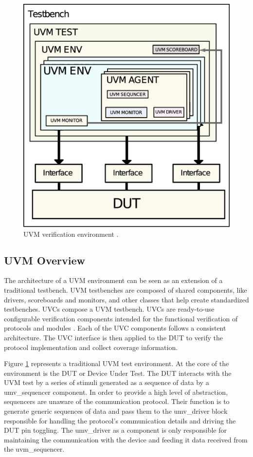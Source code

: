 \begin{figure}[htb]
\centering
\includegraphics[width=0.5\linewidth]{pictures/UVM_testbench_architecture.eps}
\caption{UVM verification environment \cite{methodology20111}.}
\label{fig:UVMvenv}
\end{figure}

\subsection{UVM Overview}
The architecture of a UVM environment can be seen as an extension of a
traditional testbench. UVM testbenches are composed of shared components, like
drivers, scoreboards and monitors, and other classes that help create
standardized testbenches. UVCs compose a UVM testbench. UVCs are ready-to-use
configurable verification components intended for the functional verification of
protocols and modules \cite{methodology20111}. Each of the UVC components
follows a consistent architecture. The UVC interface is then applied to the DUT
to verify the protocol implementation and collect coverage information.

Figure \ref{fig:UVMvenv} represents a traditional UVM test environment. At the
core of the environment is the DUT or Device Under Test. The DUT interacts with
the UVM test by a series of stimuli generated as a sequence of data by a
umv\_sequencer component. In order to provide a high level of abstraction,
sequencers are unaware of the communication protocol. Their function is to
generate generic sequences of data and pass them to the umv\_driver block
responsible for handling the protocol's communication details and driving the
DUT pin toggling. The umv\_driver as a component is only responsible for
maintaining the communication with the device and feeding it data received from
the uvm\_sequencer.

